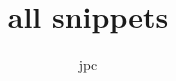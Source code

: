 \documentclass{article}
\title{all snippets}
\author{jpc}
\begin{document}
\maketitle



{\small \SnippetActiveOe}
\end{document}
